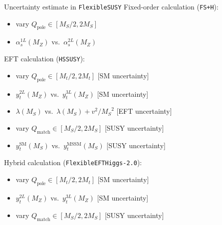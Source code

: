 \documentclass[hyperref={pdfpagelabels=false},ngerman]{beamer}
\newcommand{\MS}{\ensuremath{M_S}}
\newcommand{\SM}{\ensuremath{\text{SM}}}
\newcommand{\MSSM}{\ensuremath{\text{MSSM}}}
\newcommand{\pole}{\ensuremath{\text{pole}}}
\newcommand{\match}{\ensuremath{\text{match}}}
\begin{document}
\begin{frame}[noframenumbering]{Uncertainty estimate in \texttt{FlexibleSUSY}}
  Fixed-order calculation (\texttt{FS+H}):
  \begin{itemize}
  \item vary $Q_\pole \in [\MS/2, 2\MS]$
  \item $\alpha^{1L}_s(M_Z)$ vs.\ $\alpha^{2L}_s(M_Z)$
  \end{itemize}
  EFT calculation (\texttt{HSSUSY}):
  \begin{itemize}
  \item vary $Q_\pole \in [M_t/2, 2 M_t]$ \hfill [SM uncertainty]
  \item $y_t^{2L}(M_Z)$ vs.\ $y_t^{3L}(M_Z)$ \hfill [SM uncertainty]
  \item $\lambda(\MS)$ vs.\ $\lambda(\MS) + v^2/\MS^2$ \hfill [EFT uncertainty]
  \item vary $Q_\match \in [\MS/2, 2 \MS]$ \hfill [SUSY uncertainty]
  \item $y_t^{\SM}(\MS)$ vs.\ $y_t^{\MSSM}(\MS)$ \hfill [SUSY uncertainty]
  \end{itemize}
  Hybrid calculation (\texttt{FlexibleEFTHiggs-2.0}):
  \begin{itemize}
  \item vary $Q_\pole \in [M_t/2, 2 M_t]$ \hfill [SM uncertainty]
  \item $y_t^{2L}(M_Z)$ vs.\ $y_t^{3L}(M_Z)$ \hfill [SM uncertainty]
  \item vary $Q_\match \in [\MS/2, 2 \MS]$ \hfill [SUSY uncertainty]
  \end{itemize}
\end{frame}
\end{document}

